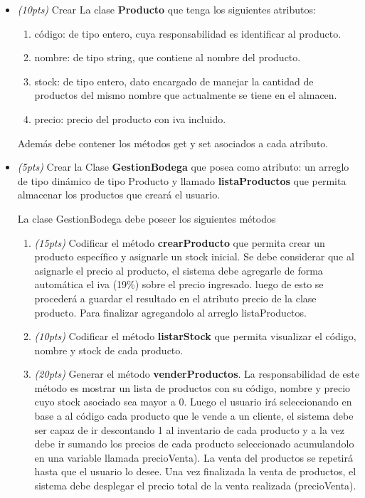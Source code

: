 \documentclass[10pt]{article}
\begin{document}
\begin{enumerate}
\begin{itemize}
\item \emph{(10pts)} Crear La clase  \textbf{Producto} que tenga los siguientes atributos:
  \begin{enumerate}
    \item c\'odigo: de tipo entero, cuya responsabilidad es identificar al producto.
	  \item nombre: de tipo string, que contiene al nombre del producto.
	  \item stock: de tipo entero, dato encargado de manejar la cantidad de productos del mismo nombre que actualmente se tiene en el almacen.
	  \item precio: precio del producto con iva incluido.
\end{enumerate}
Adem\'as debe contener los m\'etodos get y set asociados a cada atributo.

\item \emph{(5pts)} Crear la Clase \textbf{GestionBodega} que posea como atributo:
 un arreglo de tipo dinámico de tipo Producto y llamado \textbf{listaProductos} que permita almacenar los productos que crear\'a el usuario.

La clase GestionBodega debe poseer los siguientes m\'etodos
\begin{enumerate}

  \item \emph{(15pts)} Codificar el m\'etodo \textbf{crearProducto} que permita crear un  producto específico y asignarle un stock inicial. Se debe considerar que al asignarle el precio al producto, el sistema debe agregarle  de forma automática el iva (19\%) sobre el precio ingresado. luego de esto se procederá a guardar el resultado en el atributo precio de la clase producto. Para finalizar agregandolo al arreglo listaProductos.

  \item \emph{(10pts)} Codificar el m\'etodo \textbf{listarStock} que permita visualizar el c\'odigo, nombre y stock de cada producto.

  \item \emph{(20pts)} Generar el m\'etodo \textbf{venderProductos}. La responsabilidad de este método es mostrar un lista de productos con su c\'odigo, nombre y precio cuyo stock asociado sea mayor a 0.  Luego el usuario ir\'a seleccionando en base a al c\'odigo cada producto que le vende a un cliente, el sistema debe ser capaz de ir descontando 1 al inventario de cada producto  y a la vez debe ir sumando los precios de cada producto seleccionado acumulandolo en una variable llamada precioVenta). La venta del productos se repetir\'a hasta que el usuario lo desee. Una vez finalizada la venta de productos, el sistema debe desplegar el precio total de la venta realizada (precioVenta).


\end{enumerate}
\end{itemize}
\end{enumerate}
\end{document}
